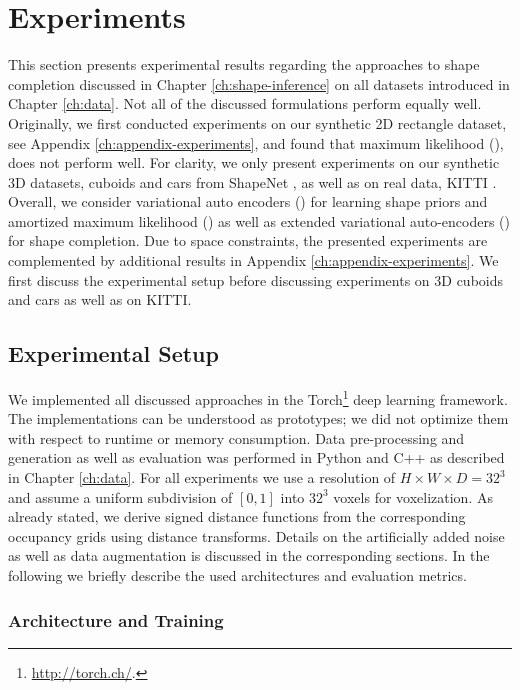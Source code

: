 \chapter{Experiments}
\label{ch:experiments}

This section presents experimental results regarding the
approaches to shape completion discussed in Chapter \ref{ch:shape-inference}
on all datasets introduced in Chapter \ref{ch:data}. Not all of the discussed
formulations perform equally well. Originally, we first conducted experiments
on our synthetic 2D rectangle dataset, see Appendix \ref{ch:appendix-experiments}, 
and found that maximum likelihood (\ML), does not perform well. For clarity, we
only present experiments on our synthetic 3D datasets, \ie cuboids and cars from ShapeNet
\cite{ChangFunkhouserGuibasSavarese:2015}, as well as on real data, \ie 
KITTI \cite{GeigerLenzUrtasun:2012,GeigerLenzStillerUrtasun:2013}.
Overall, we consider variational auto encoders (\VAEs) for learning shape priors
and amortized maximum likelihood (\AML) as well as
extended variational auto-encoders (\EVAEs) for shape completion.
Due to space constraints, the presented experiments are complemented
by additional results in Appendix \ref{ch:appendix-experiments}.
We first discuss the experimental setup before discussing experiments
on 3D cuboids and cars as well as on KITTI.

\section{Experimental Setup}

We implemented all discussed approaches in the Torch\footnote{
  \url{http://torch.ch/}.
} deep learning framework. The implementations can be understood as prototypes;
we did not optimize them with respect to runtime or memory consumption.
Data pre-processing and generation as well as evaluation was performed in Python
and C++ as described in Chapter \ref{ch:data}. For all experiments we use a resolution
of $H \times W \times D = 32^3$ and assume a uniform subdivision of $[0,1]$ into
$32^3$ voxels for voxelization. As already stated, we derive signed distance functions
from the corresponding occupancy grids using distance transforms. Details on the
artificially added noise as well as data augmentation is discussed in the corresponding
sections.
In the following we briefly describe the used architectures
and evaluation metrics.

\subsection{Architecture and Training}

